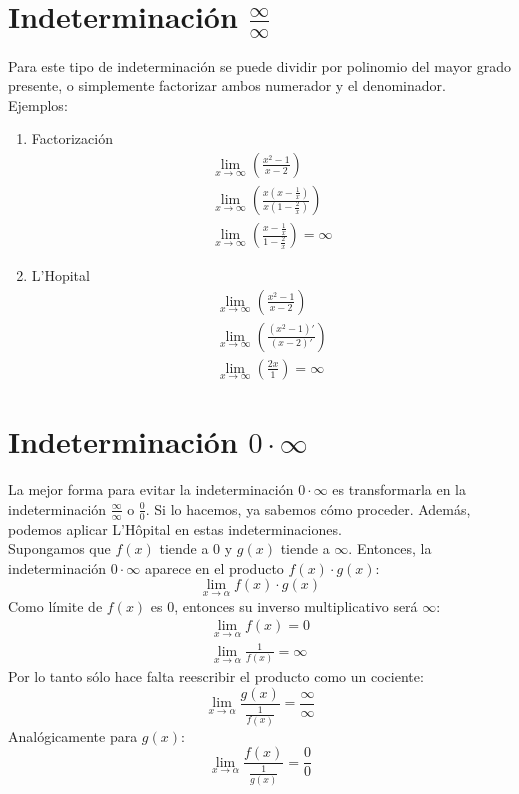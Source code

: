 \documentclass[12pt, a4paper]{article}
\begin{document}
\section{Indeterminación $\displaystyle \frac{\infty}{\infty}$}
Para este tipo de indeterminación se puede dividir por polinomio del mayor grado presente, o simplemente factorizar ambos numerador y el denominador.\\[6pt]
Ejemplos:

\vspace{0.5cm}
\begin{enumerate}
    \item Factorización
    \begin{eqnarray}
        \lim_{x\to\infty}\left(\frac{x^2-1}{x-2}\right)\\
        \lim_{x\to\infty}\left(\frac{x\left(x-\frac{1}{x}\right)}{x\left(1-\frac{2}{x}\right)}\right)\\
        \lim_{x\to\infty}\left(\frac{x-\frac{1}{x}}{1-\frac{2}{x}}\right) = \infty
    \end{eqnarray}
    
    \item L'Hopital
    \begin{eqnarray}
        \lim_{x\to\infty} \left(\frac{x^2-1}{x-2}\right)\\
        \lim_{x\to\infty} \left(\frac{\left(x^2-1\right)'}{\left(x-2\right)'}\right)\\
        \lim_{x\to\infty}\left(\frac{2x}{1}\right) = \infty
    \end{eqnarray}
\end{enumerate}
\newpage

\section{Indeterminación $\displaystyle 0 \cdot \infty$}
La mejor forma para evitar la indeterminación $\displaystyle 0 \cdot \infty$ es transformarla en la indeterminación $\displaystyle \frac{\infty}{\infty}$ o $\displaystyle \frac{0}{0}$. Si lo hacemos, ya sabemos cómo proceder. Además, podemos aplicar L'Hôpital en estas indeterminaciones.\\[6pt]
Supongamos que $f(x)$ tiende a $0$ y $g(x)$ tiende a $\infty$. Entonces, la indeterminación $0 \cdot \infty$ aparece en el producto $f(x) \cdot g(x)$: $$\lim_{x\to\alpha}f(x) \cdot g(x)$$ Como límite de $f(x)$ es $0$, entonces su inverso multiplicativo será $\infty$:
\setcounter{equation}{0}
\begin{eqnarray}
    \lim_{x\to\alpha}f(x) = 0\\
    \lim_{x\to\alpha}\frac{1}{f(x)} = \infty
\end{eqnarray}
Por lo tanto sólo hace falta reescribir el producto como un cociente: $$\lim_{x\to\alpha}\frac{g(x)}{\frac{1}{f(x)}} = \frac{\infty}{\infty}$$
Analógicamente para $g(x)$: $$\lim_{x\to\alpha}\frac{f(x)}{\frac{1}{g(x)}} = \frac{0}{0}$$
\end{document}
